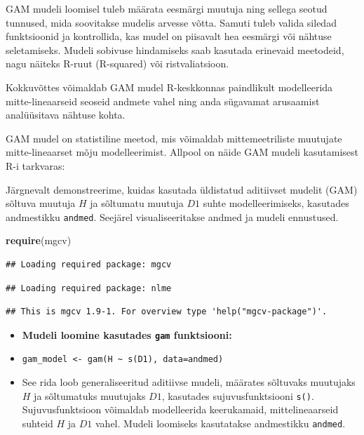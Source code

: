 \documentclass[
]{book}
\newenvironment{Shaded}{\begin{snugshade}}{\end{snugshade}}
\newcommand{\FunctionTok}[1]{\textcolor[rgb]{0.13,0.29,0.53}{\textbf{#1}}}
\newcommand{\NormalTok}[1]{#1}
\providecommand{\tightlist}{%
  \setlength{\itemsep}{0pt}\setlength{\parskip}{0pt}}
\renewenvironment{Shaded} {\begin{snugshade}\footnotesize} {\end{snugshade}}
\begin{document}
GAM mudeli loomisel tuleb määrata eesmärgi muutuja ning sellega seotud tunnused, mida soovitakse mudelis arvesse võtta. Samuti tuleb valida siledad funktsioonid ja kontrollida, kas mudel on piisavalt hea eesmärgi või nähtuse seletamiseks. Mudeli sobivuse hindamiseks saab kasutada erinevaid meetodeid, nagu näiteks R-ruut (R-squared) või ristvaliatsioon.

Kokkuvõttes võimaldab GAM mudel R-keskkonnas paindlikult modelleerida mitte-lineaarseid seoseid andmete vahel ning anda sügavamat arusaamist analüüsitava nähtuse kohta.

GAM mudel on statistiline meetod, mis võimaldab mittemeetriliste muutujate mitte-lineaarset mõju modelleerimist. Allpool on näide GAM mudeli kasutamisest R-i tarkvaras:

Järgnevalt demonstreerime, kuidas kasutada üldistatud aditiivset mudelit (GAM) sõltuva muutuja \(H\) ja sõltumatu muutuja \(D1\) suhte modelleerimiseks, kasutades andmestikku \texttt{andmed}. Seejärel visualiseeritakse andmed ja mudeli ennustused.

\begin{Shaded}
\begin{Highlighting}[]
\FunctionTok{require}\NormalTok{(mgcv)}
\end{Highlighting}
\end{Shaded}

\begin{verbatim}
## Loading required package: mgcv
\end{verbatim}

\begin{verbatim}
## Loading required package: nlme
\end{verbatim}

\begin{verbatim}
## This is mgcv 1.9-1. For overview type 'help("mgcv-package")'.
\end{verbatim}

\begin{itemize}
\tightlist
\item
  \textbf{Mudeli loomine kasutades \texttt{gam} funktsiooni:}
\item
  \texttt{gam\_model\ \textless{}-\ gam(H\ \textasciitilde{}\ s(D1),\ data=andmed)}
\item
  See rida loob generaliseeritud aditiivse mudeli, määrates sõltuvaks muutujaks \(H\) ja sõltumatuks muutujaks \(D1\), kasutades sujuvusfunktsiooni \texttt{s()}. Sujuvusfunktsioon võimaldab modelleerida keerukamaid, mittelineaarseid suhteid \(H\) ja \(D1\) vahel. Mudeli loomiseks kasutatakse andmestikku \texttt{andmed}.
\end{itemize}
\end{document}
